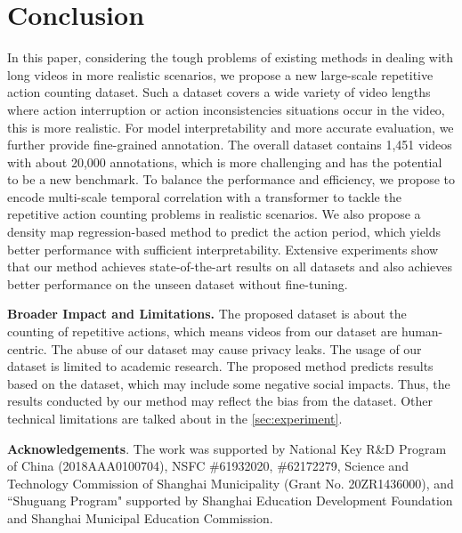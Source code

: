 \documentclass[10pt,twocolumn,letterpaper]{article}
\begin{document}
\section{Conclusion}

In this paper, considering the tough problems of existing methods in dealing with long videos in more realistic scenarios, we propose a new large-scale repetitive action counting dataset. Such a dataset covers a wide variety of video lengths where action interruption or action inconsistencies situations occur in the video, this is more realistic. For model interpretability and more accurate evaluation, we further provide fine-grained annotation. The overall dataset contains 1,451 videos with about 20,000 annotations, which is more challenging and has the potential to be a new benchmark.
To balance the performance and efficiency, we propose to encode multi-scale temporal correlation with a transformer to tackle the repetitive action counting problems in realistic scenarios. We also propose a density map regression-based method to predict the action period, which yields better performance with sufficient interpretability. Extensive experiments show that our method achieves state-of-the-art results on all datasets and also achieves better performance on the unseen dataset without fine-tuning.

\noindent \textbf{Broader Impact and Limitations.} The proposed dataset is about the counting of repetitive actions, which means videos from our dataset are human-centric. The abuse of our dataset may cause privacy leaks. The usage of our dataset is limited to academic research. The proposed method predicts results based on the dataset, which may include some negative social impacts. Thus, the results conducted by our method may reflect the bias from the dataset. Other technical limitations are talked about in the \cref{sec:experiment}.

\noindent \textbf{Acknowledgements}. 
The work was supported by National Key R\&D Program of China (2018AAA0100704), NSFC \#61932020, \#62172279,  Science and Technology Commission of Shanghai Municipality (Grant No. 20ZR1436000), and “Shuguang Program" supported by Shanghai Education Development Foundation and Shanghai Municipal Education Commission. 



\newpage

{\small


}

\appendix
\setcounter{page}{1}
\end{document}
